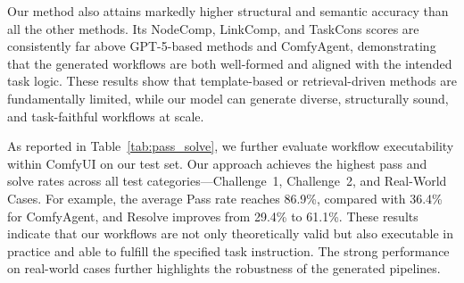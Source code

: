 \documentclass[runningheads]{llncs}
\begin{document}
Our method also attains markedly higher structural and semantic accuracy than all the other methods. Its NodeComp, LinkComp, and TaskCons scores are consistently far above GPT-5-based methods and ComfyAgent, demonstrating that the generated workflows are both well-formed and aligned with the intended task logic. These results show that template-based or retrieval-driven methods are fundamentally limited, while our model can generate diverse, structurally sound, and task-faithful workflows at scale.

As reported in Table~\ref{tab:pass_solve}, we further evaluate workflow executability within ComfyUI on our test set. Our approach achieves the highest pass and solve rates across all test categories—Challenge~1, Challenge~2, and Real-World Cases. For example, the average Pass rate reaches 86.9\%, compared with 36.4\% for ComfyAgent, and Resolve improves from 29.4\% to 61.1\%. 
These results indicate that our workflows are not only theoretically valid but also executable in practice and able to fulfill the specified task instruction. The strong performance on real-world cases further highlights the robustness of the generated pipelines.

\begin{table}[!t]
\centering
\caption{Results grouped by test set categories.
\emph{Pass} indicates the generated workflow executes successfully without structural or runtime errors.
\emph{Resolve} indicates the workflow executes and fulfills the given instruction.}
\label{tab:pass_solve}
\end{table}
\end{document}
